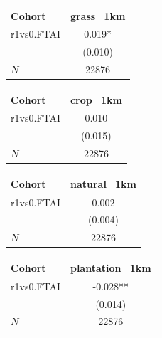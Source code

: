 {
\def\sym#1{\ifmmode^{#1}\else\(^{#1}\)\fi}
\begin{tabular}{l*{1}{c}}
\toprule
Cohort    &grass\_1km   \\
\midrule
r1vs0.FTAI&    0.019*  \\
          &  (0.010)   \\
\midrule
\(N\)     &    22876   \\
\bottomrule
\end{tabular}
}
{
\def\sym#1{\ifmmode^{#1}\else\(^{#1}\)\fi}
\begin{tabular}{l*{1}{c}}
\toprule
Cohort    & crop\_1km   \\
\midrule
r1vs0.FTAI&    0.010   \\
          &  (0.015)   \\
\midrule
\(N\)     &    22876   \\
\bottomrule
\end{tabular}
}
{
\def\sym#1{\ifmmode^{#1}\else\(^{#1}\)\fi}
\begin{tabular}{l*{1}{c}}
\toprule
Cohort    &natural\_1km   \\
\midrule
r1vs0.FTAI&    0.002   \\
          &  (0.004)   \\
\midrule
\(N\)     &    22876   \\
\bottomrule
\end{tabular}
}
{
\def\sym#1{\ifmmode^{#1}\else\(^{#1}\)\fi}
\begin{tabular}{l*{1}{c}}
\toprule
Cohort    &plantation\_1km   \\
\midrule
r1vs0.FTAI&   -0.028** \\
          &  (0.014)   \\
\midrule
\(N\)     &    22876   \\
\bottomrule
\end{tabular}
}
